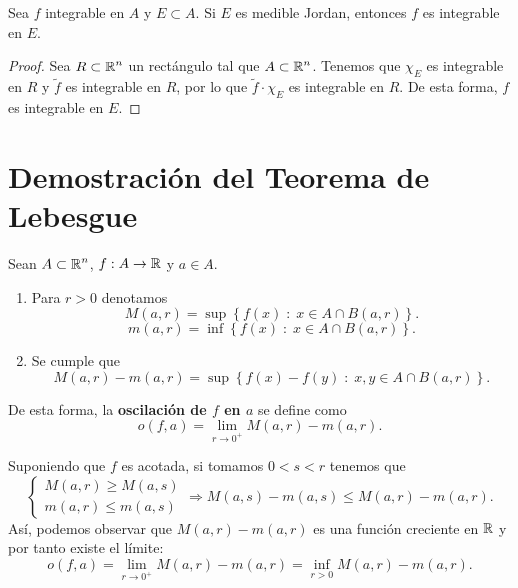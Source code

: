 \begin{prop}
Sea $\displaystyle f $ integrable en $\displaystyle A $ y $\displaystyle E \subset A $. Si $\displaystyle E $ es medible Jordan, entonces $\displaystyle f $ es integrable en $\displaystyle E $.
\end{prop}
\begin{proof}
	Sea $\displaystyle R \subset \mathbb{R}^{n} $ un rectángulo tal que $\displaystyle A \subset \mathbb{R}^{n} $. Tenemos que $\displaystyle \chi_{E} $ es integrable en $\displaystyle R $ y $\displaystyle \tilde{f} $ es integrable en $\displaystyle R $, por lo que $\displaystyle \tilde{f} \cdot \chi_{E} $ es integrable en $\displaystyle R $. De esta forma, $\displaystyle f $ es integrable en $\displaystyle E $. 
\end{proof}

\section{Demostración del Teorema de Lebesgue}
\begin{definition}
Sean $\displaystyle A \subset \mathbb{R}^{n} $, $\displaystyle f : A \to \mathbb{R} $ y $\displaystyle a \in A $. 
\begin{enumerate}
\item Para $\displaystyle r > 0 $ denotamos 
	\[M\left(a,r\right)= \sup \left\{ f\left(x\right)\; : \; x \in A \cap B\left(a,r\right)\right\}  .\]
	\[m\left(a,r\right)= \inf \left\{ f\left(x\right) \; : \; x \in A \cap B\left(a,r\right)\right\}  .\]
\item Se cumple que
	\[ M\left(a,r\right)-m\left(a,r\right)= \sup \left\{ f\left(x\right)-f\left(y\right) \; : \; x,y \in A \cap B\left(a,r\right)\right\}  .\]
\end{enumerate}
De esta forma, la \textbf{oscilación de $\displaystyle f $ en $\displaystyle a $} se define como
\[o\left(f,a\right)=\lim_{r \to 0^{+}}M\left(a,r\right)-m\left(a,r\right) .\]
\end{definition}
\begin{observation}
Suponiendo que $\displaystyle f $ es acotada, si tomamos $\displaystyle 0 < s < r $ tenemos que 
\[
\begin{cases}
M\left(a,r\right) \geq M\left(a,s\right) \\
m\left(a,r\right) \leq m\left(a,s\right)
\end{cases}
\Rightarrow M\left(a,s\right)-m\left(a,s\right) \leq M\left(a,r\right)-m\left(a,r\right).\]
Así, podemos observar que $\displaystyle M\left(a,r\right)-m\left(a,r\right) $ es una función creciente en $\displaystyle \mathbb{R} $ y por tanto existe el límite:
\[o\left(f,a\right)=\lim_{r \to 0^{+}}M\left(a,r\right)-m\left(a,r\right) = \inf_{r > 0}M\left(a,r\right)-m\left(a,r\right) .\]
\end{observation}

